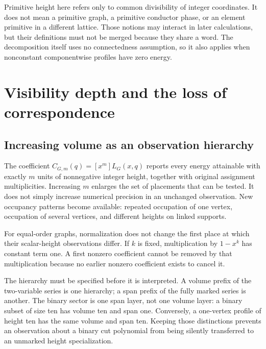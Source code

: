 \documentclass[
  11pt,
  a4paper,
]{report}
\begin{document}
Primitive height here refers only to common divisibility of integer
coordinates. It does not mean a primitive graph, a primitive conductor
phase, or an element primitive in a different lattice. Those notions may
interact in later calculations, but their definitions must not be merged
because they share a word. The decomposition itself uses no
connectedness assumption, so it also applies when nonconstant
componentwise profiles have zero energy.

\hypertarget{visibility-depth-and-the-loss-of-correspondence}{%
\chapter{Visibility depth and the loss of
correspondence}\label{visibility-depth-and-the-loss-of-correspondence}}

\hypertarget{increasing-volume-as-an-observation-hierarchy}{%
\section{Increasing volume as an observation
hierarchy}\label{increasing-volume-as-an-observation-hierarchy}}

The coefficient \(C_{G,m}(q)=[x^m]L_G(x,q)\) reports every energy
attainable with exactly \(m\) units of nonnegative integer height,
together with original assignment multiplicities. Increasing \(m\)
enlarges the set of placements that can be tested. It does not simply
increase numerical precision in an unchanged observation. New occupancy
patterns become available: repeated occupation of one vertex, occupation
of several vertices, and different heights on linked supports.

For equal-order graphs, normalization does not change the first place at
which their scalar-height observations differ. If \(k\) is fixed,
multiplication by \(1-x^k\) has constant term one. A first nonzero
coefficient cannot be removed by that multiplication because no earlier
nonzero coefficient exists to cancel it.

The hierarchy must be specified before it is interpreted. A volume
prefix of the two-variable series is one hierarchy; a span prefix of the
fully marked series is another. The binary sector is one span layer, not
one volume layer: a binary subset of size ten has volume ten and span
one. Conversely, a one-vertex profile of height ten has the same volume
and span ten. Keeping those distinctions prevents an observation about a
binary cut polynomial from being silently transferred to an unmarked
height specialization.
\end{document}
